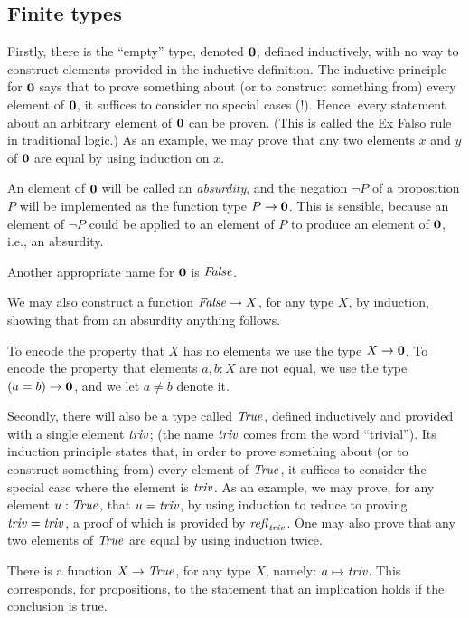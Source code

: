 \subsection{Finite types}
\label{sec:finite-types}
Firstly, there is the ``empty'' type, denoted $\mathbf{0} $, defined inductively, with no way to construct elements provided in the inductive
definition.  The inductive principle for $\mathbf{0} $ says that to prove something about (or to construct something from) every element of
$\mathbf{0} $, it suffices to consider no special cases (!).  Hence, every statement about an arbitrary element of $\mathbf{0} $ can be proven. (This is called the Ex Falso
rule in traditional logic.) As
an example, we may prove that any two elements $x$ and $y$ of $\mathbf{0} $ are equal by using induction on $x$.

An element of $\mathbf{0} $ will be called an \emph{absurdity}, and the negation $\neg P$ of a proposition $P$ will be implemented as the function
type $P \to \mathbf{0} $.  This is sensible, because an element of $\neg P$ could be applied to an element of $P$ to produce an element of
$\mathbf{0} $, i.e., an absurdity.

Another appropriate name for $\mathbf{0} $ is $\mathop{\mathit{False}}$.

We may also construct a function $\mathop{\mathit{False}} \to X$, for any type $X$, by induction, showing that from an absurdity anything follows.

To encode the property that $X$ has no elements we use the type $X \to \mathbf{0} $.  To encode the property that elements $a,b:X$ are not equal,
we use the type $(a=b) \to \mathbf{0} $, and we let $a \ne b$ denote it.

Secondly, there will also be a type called $\mathop{\mathit{True}}$, defined inductively and provided with a single element $\mathop{\mathit{triv}}$; (the name $\mathop{\mathit{triv}}$ comes from the word
  ``trivial'').  Its induction principle
states that, in order to prove something about (or to construct something from) every element of $\mathop{\mathit{True}}$, it suffices to consider the special
case where the element is $\mathop{\mathit{triv}}$.  As an example, we may prove, for any element $u : \mathop{\mathit{True}}$, that $u=\mathop{\mathit{triv}}$, by using induction to reduce
to proving $\mathop{\mathit{triv}}=\mathop{\mathit{triv}}$, a proof of which is provided by $\mathop{{\it refl}_{\mathop{\mathit{triv}}}}$.  One may also prove that any two elements of $\mathop{\mathit{True}}$ are equal by using induction twice.

There is a function $X \to \mathop{\mathit{True}}$, for any type $X$, namely: $a \mapsto \mathop{\mathit{triv}}$.  This corresponds, for propositions, to the statement that an
implication holds if the conclusion is true.


